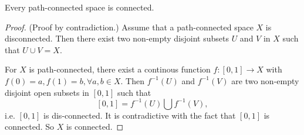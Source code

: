 \documentclass[oneside]{report}
\theoremstyle{mytheoremstyle}
\theoremstyle{mytheoremstyle}
\theoremstyle{myproblemstyle}
\begin{document}
\begin{problem}
    Every path-connected space is connected.
\end{problem}
\begin{proof}
    (Proof by contradiction.) Assume that a path-connected space $X$ is disconnected. Then there exist two non-empty disjoint subsets $U$ and $V$ in $X$ such that $U\cup V=X$.

    For $X$ is path-connected, there exist a continous function $f\colon [0,1]\to X$ with $f(0)=a,f(1)=b, \forall a,b\in X$. Then $f^{-1}(U)$ and $f^{-1}(V)$ are two non-empty disjoint open subsets in $[0,1]$ such that 
    \[[0,1]=f^{-1}(U)\bigcup f^{-1}(V),\]
    i.e. $[0,1]$ is dis-connected.
    It is contradictive with the fact that $[0,1]$ is connected. So $X$ is connected.
    
\end{proof}
\end{document}
